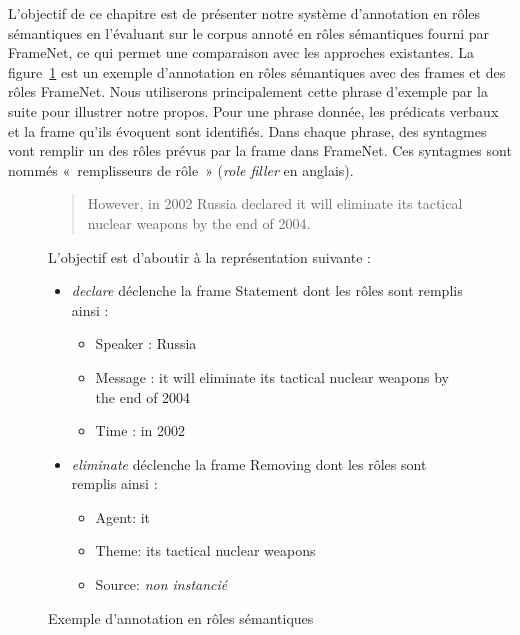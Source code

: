 L'objectif de ce chapitre est de présenter notre système d'annotation en rôles
sémantiques en l'évaluant sur le corpus annoté en rôles sémantiques fourni par
FrameNet, ce qui permet une comparaison avec les approches existantes. La
figure~\ref{fig:srlrussia} est un exemple d'annotation en rôles sémantiques
avec des frames et des rôles FrameNet. Nous utiliserons principalement cette
phrase d'exemple par la suite pour illustrer notre propos. Pour une phrase
donnée, les prédicats verbaux et la frame qu'ils évoquent sont identifiés. Dans
chaque phrase, des syntagmes vont remplir un des rôles prévus par la frame dans
FrameNet. Ces syntagmes sont nommés «~remplisseurs de rôle~» (\emph{role
filler} en anglais).

\begin{figure}[ht]
    \begin{quote}
    However, in 2002 Russia declared it will eliminate its tactical nuclear weapons by the end of 2004.
    \end{quote}

    L'objectif est d'aboutir à la représentation suivante :

    \begin{itemize}
        \item \emph{declare} déclenche la frame Statement dont les rôles sont remplis ainsi :
        \begin{itemize}
            \item Speaker : Russia
            \item Message : it will eliminate its tactical nuclear weapons by the end of 2004
            \item Time : in 2002
        \end{itemize}
        \item \emph{eliminate} déclenche la frame Removing dont les rôles sont remplis ainsi :
        \begin{itemize}
            \item Agent: it
            \item Theme: its tactical nuclear weapons
            \item Source: \emph{non instancié}
        \end{itemize}
    \end{itemize}
    \caption{\label{fig:srlrussia}Exemple d'annotation en rôles sémantiques}
\end{figure}

